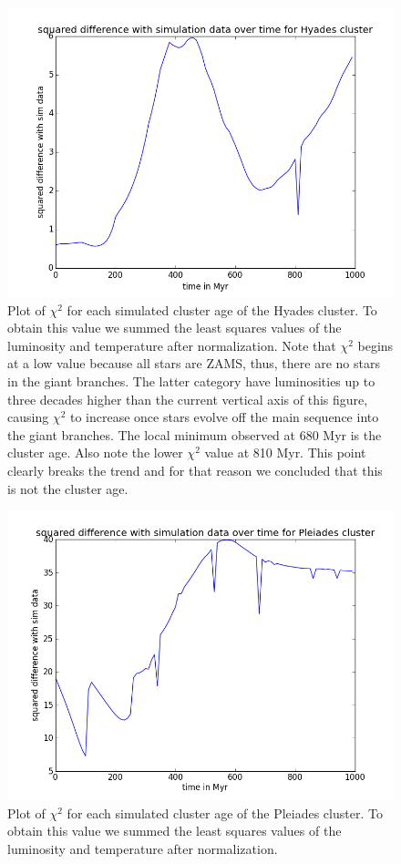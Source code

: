 \documentclass{aa}
\begin{document}
\begin{figure}
    \centering
    \includegraphics[width=\hsize]{img/fitness_over_time.png}
    \caption{Plot of $\chi^2$ for each simulated cluster age of the Hyades cluster. To obtain this value we summed the least squares values of the luminosity and temperature after normalization. Note that $\chi^2$ begins at a low value because all stars are ZAMS, thus, there are no stars in the giant branches. The latter category have luminosities up to three decades higher than the current vertical axis of this figure, causing $\chi^2$ to increase once stars evolve off the main sequence into the giant branches. The local minimum observed at 680 Myr is the cluster age. Also note the lower $\chi^2$ value at 810 Myr. This point clearly breaks the trend and for that reason we concluded that this is not the cluster age.}\label{fig:chisq}
\end{figure}


\begin{figure}
    \centering
    \includegraphics[width=\hsize]{img/fitness_over_time_pleiades.png}
    \caption{Plot of $\chi^2$ for each simulated cluster age of the Pleiades cluster. To obtain this value we summed the least squares values of the luminosity and temperature after normalization. }\label{fig:chisq_pleiades}
\end{figure}
\end{document}
